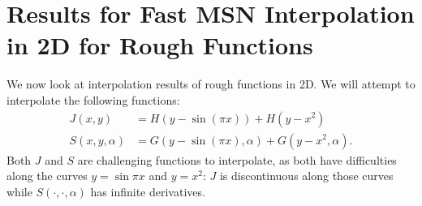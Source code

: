 \section{Results for Fast MSN Interpolation in 2D for Rough Functions}
\label{sec:rough_2D_sim}

We now look at interpolation results of rough functions in 2D.
We will attempt to interpolate the following functions:
%
\begin{align}
    J(x,y) &= H(y-\sin(\pi x)) + H(y-x^{2}) \nonumber\\
    S(x,y,\alpha) &= G(y-\sin(\pi x),\alpha) + G(y-x^{2},\alpha).
\end{align}
%
Both $J$ and $S$ are challenging functions to interpolate,
as both have difficulties along the curves $y=\sin\pi x$ and $y=x^{2}$:
$J$ is discontinuous along those curves while $S(\cdot,\cdot,\alpha)$
has infinite derivatives.
